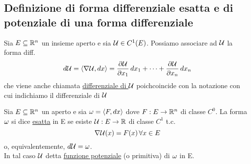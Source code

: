 \subsection{Definizione di forma differenziale esatta e di potenziale di una
forma differenziale}
Sia $E\subseteq\mathbb{R}^n$ un insieme aperto e sia $\mathcal{U} \in C^1(E)$. Possiamo associare ad $\mathcal{U}$
la forma diff. 
$$d\mathcal{U} = \left\langle \nabla\mathcal{U},dx \right\rangle = \frac{\partial \mathcal{U}}{\partial x_1}\,dx_1+\dots+\frac{\partial \mathcal{U}}{\partial x_n}\,dx_n$$
che viene anche chiamata \underline{differenziale di $\mathcal{U}$} poich\ace coincide con la notazione
con cui indichiamo il differenziale di $\mathcal{U}$
\begin{definition}
  Sia $E\subseteq\mathbb{R}^n$ un aperto e sia $\omega = \left\langle F,dx \right\rangle$ dove
  $F:E\to\mathbb{R}^n$ di classe $C^0$. La forma $\omega$ si dice \underline{esatta} in E 
  se esiste $\mathcal{U}:E\to\mathbb{R}$ di classe $C^1$ t.c.
  $$\nabla\mathcal{U}(x) = F(x) \, \forall x \in E$$
  o, equivalentemente, $d\mathcal{U} = \omega$.\\
  In tal caso $\mathcal{U}$ \ace detta \underline{funzione potenziale} (o primitiva) di $\omega$ in E.
\end{definition}

